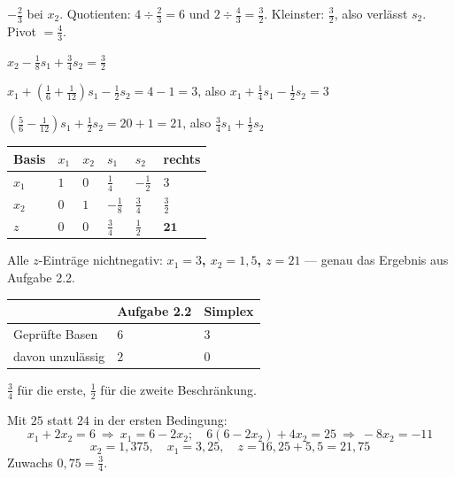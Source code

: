 \begin{aufgabe}
$-\frac23$ bei $x_2$. Quotienten: $4 \div \frac23 = 6$ und $2 \div \frac43 = \frac32$. Kleinster: $\frac32$, also verlässt $s_2$. Pivot $= \frac43$.

 $x_2 - \frac18 s_1 + \frac34 s_2 = \frac32$

 $x_1 + \left(\frac16 + \frac{1}{12}\right)s_1 - \frac12 s_2 = 4 - 1 = 3$, also $x_1 + \frac14 s_1 - \frac12 s_2 = 3$

 $\left(\frac56 - \frac{1}{12}\right)s_1 + \frac12 s_2 = 20 + 1 = 21$, also $\frac34 s_1 + \frac12 s_2$

\begin{center}
{\small
\renewcommand{\arraystretch}{1.48}
\begin{tabular}{@{}P{1.6cm}P{1.4cm}P{1.4cm}P{1.4cm}P{1.4cm}P{1.4cm}@{}}
\toprule
\textbf{Basis} & $x_1$ & $x_2$ & $s_1$ & $s_2$ & \textbf{rechts}\\
\midrule
$x_1$ & $1$ & $0$ & $\tfrac14$ & $-\tfrac12$ & $3$\\
$x_2$ & $0$ & $1$ & $-\tfrac18$ & $\tfrac34$ & $\tfrac32$\\
\midrule
$z$ & $0$ & $0$ & $\tfrac34$ & $\tfrac12$ & $\mathbf{21}$\\
\bottomrule
\end{tabular}}
\end{center}

Alle $z$-Einträge nichtnegativ: \textbf{$x_1 = 3$, $x_2 = 1{,}5$, $z = 21$} --- genau das Ergebnis aus Aufgabe 2.2. \checkmark

\begin{center}
\renewcommand{\arraystretch}{1.48}
\begin{tabular}{@{}P{2.8cm}P{2.4cm}P{2.4cm}@{}}
\toprule
& \textbf{Aufgabe 2.2} & \textbf{Simplex}\\
\midrule
Geprüfte Basen & $6$ & $3$\\
davon unzulässig & $2$ & $0$\\
\bottomrule
\end{tabular}
\end{center}

$\frac34$ für die erste, $\frac12$ für die zweite Beschränkung.

 Mit $25$ statt $24$ in der ersten Bedingung:
\[ x_1 + 2x_2 = 6 \ \Rightarrow\ x_1 = 6-2x_2; \quad 6(6-2x_2)+4x_2 = 25 \ \Rightarrow\ -8x_2 = -11 \]
\[ x_2 = 1{,}375, \quad x_1 = 3{,}25, \quad z = 16{,}25+5{,}5 = 21{,}75 \]
Zuwachs $0{,}75 = \frac34$. \checkmark
\end{aufgabe}

